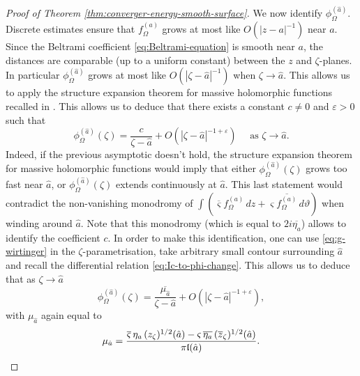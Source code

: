 \documentclass[reqno]{amsart}
\numberwithin{equation}{section}
\theoremstyle{definition}
\theoremstyle{remark}
\begin{document}
\begin{proof}[Proof of Theorem \ref{thm:converger-energy-smooth-surface}]
We now identify $\phi_{\Omega}^{(\hat{a})}$. Discrete estimates ensure that $f^{(a)}_{\Omega}$ grows at most like $O(|z-a|^{-1})$ near $a$. Since the Beltrami coefficient \eqref{eq:Beltrami-equation} is smooth near $a$, the distances are comparable (up to a uniform constant) between the $z$ and $\zeta$-planes. In particular $\phi_{\Omega}^{(\hat{a})}$ grows at most like $O(|\zeta-\hat{a}|^{-1})$ when $\zeta \to \hat{a}$. This allows us to apply the structure expansion theorem for massive holomorphic functions recalled in \cite[(6.1.8) in Remark 6.9]{park2025near}. This allows us to deduce that there exists a constant $c \neq 0$ and $\varepsilon >0 $ such that
\begin{equation*}
	\phi_{\Omega}^{(\hat{a})}(\zeta)= \frac{c}{\zeta-\hat{a}} + O(|\zeta - \hat{a}|^{-1+\varepsilon}) \quad \textrm{ as } \zeta \to \hat{a}.
\end{equation*}
Indeed, if the previous asymptotic doesn't hold,  the structure expansion theorem for massive holomorphic functions would imply that either $\phi_{\Omega}^{(\hat{a})}(\zeta)$ grows too fast near $\hat{a}$, or $\phi_{\Omega}^{(\hat{a})}(\zeta)$ extends continuously at $\hat{a}$. This last statement would contradict the non-vanishing monodromy of $\int (\overline{\varsigma}f^{(a)}_\Omega\,dz + \varsigma \overline{f^{(a)}_\Omega}\,d\vartheta)$ when winding around $\hat{a}$. Note that this monodromy (which is equal to $2i\overline{\eta_a}$) allows to identify the coefficient $c$. In order to make this identification, one can use  \eqref{eq:g-wirtinger} in the $\zeta$-parametrisation, take arbitrary small contour surrounding $\hat{a}$ and recall the differential relation \eqref{eq:Ic-to-phi-change}. This allows us to  deduce that as $\zeta \to \hat{a} $
\begin{equation}\label{eq:expansion-massive-fermion}
	\phi_{\Omega}^{(\hat{a})}(\zeta)= \frac{\overline{\mu_{\hat{a}}}}{\zeta-\hat{a}} + O(|\zeta - \hat{a}|^{-1+\varepsilon}), \end{equation}
with $\mu_{\hat{a}}$ again equal to 
\begin{equation*}
	\mu_{\hat{a}} = \frac{\overline{\varsigma}\,\eta_a\,(z_{\zeta})^{1/2}(\hat{a}) - \varsigma\,\overline{\eta_a}\,(\overline{z}_{\zeta})^{1/2}(\hat{a})}{\pi \frak{l}(\hat{a})}.
\end{equation*}


\end{proof}
\end{document}
